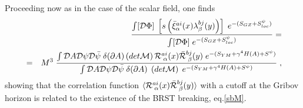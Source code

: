 Proceeding now as in the case of the scalar field, one finds 
%
\begin{eqnarray} 
	&&
	\frac{ \int [{\cal D} {\Phi}] \;   \left[ s \left( {\bar \xi}^{ai}_{\alpha}(x) {\lambda}^{bj}_\beta(y)  \right)   \right] \; e^{-(S_{GZ}+S^{\psi}_{loc})} }{ \int [{\cal D} {\Phi}]    \; e^{-(S_{GZ}+S^{\psi}_{loc})}}  =
	\nonumber \\
	&=&
	M^3 \; \frac{  \int {\cal D}A {\cal D}{\psi} {\cal D}{\bar \psi} \; \delta(\partial A)  \left( det{\cal M} \right) {\cal R}^{ai}_{\;\alpha}(x)  {\bar {\cal R}}^{bj}_{\;\beta}(y)  \; e^{-(S_{YM}+\gamma^4 H(A) + S^{\psi})} } {\int {\cal D}A {\cal D}{\psi} {\cal D}{\bar \psi} \; \delta(\partial A) \; \left( det{\cal M} \right)   \; e^{-(S_{YM}+\gamma^4 H(A) + S^{\psi})}  } \;,\label{brstpsi}
\end{eqnarray}
%
showing that  the correlation function $\langle {\cal R}^{ai}_{\;\alpha}(x)  {\bar {\cal R}}^{bj}_{\;\beta}(y) \rangle$  with a cutoff at the Gribov horizon is  related to the existence of the BRST breaking, eq.\eqref{sbM}. 

